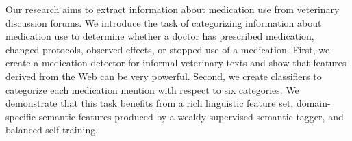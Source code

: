 Our research aims to extract information about medication use from veterinary discussion forums. We introduce the task of categorizing information about medication use to determine whether a doctor has prescribed medication, changed protocols, observed effects, or stopped use of a medication. First, we create a medication detector for informal veterinary texts and show that features derived from the Web can be very powerful. Second, we create classifiers to categorize each medication mention with respect to six categories.  We demonstrate that this task benefits from a rich linguistic feature set, domain-specific semantic features produced by a weakly supervised semantic tagger, and balanced self-training.
